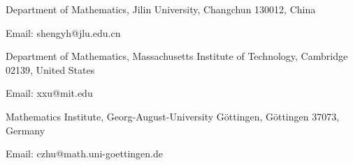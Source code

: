 \documentclass[letterpaper,10pt, oneside]{article} %
\begin{document}
 \vspace{3mm}
Department of Mathematics, Jilin University,
 Changchun 130012,  China

Email: shengyh@jlu.edu.cn
 \vspace{3mm}

Department of Mathematics, Massachusetts Institute of Technology,
Cambridge 02139, United States

Email: xxu@mit.edu
 \vspace{3mm}

Mathematics Institute, Georg-August-University
G\"ottingen,  G\"ottingen 37073, Germany

Email: czhu@math.uni-goettingen.de
\end{document}
